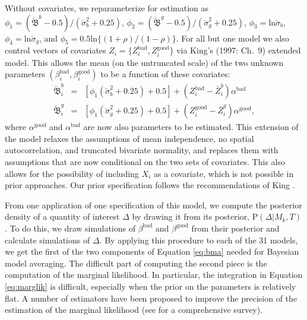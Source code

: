 \documentclass[11pt,titlepage]{article}
\newcommand{\bbetau}{\breve{\mathfrak B}}
\newcommand{\sigmau}{\breve{\sigma}}
\renewcommand{\P}{\text{P}}
\newcommand{\bb}{\beta^{\text{bad}}}
\newcommand{\bg}{\beta^{\text{good}}}
\begin{document}
Without covariates, we reparameterize for estimation as
$\phi_1=(\bbetau^b-0.5)/(\sigmau_b^2+0.25)$,
$\phi_2=(\bbetau^g-0.5)/(\sigmau_g^2+0.25)$,
$\phi_3=\text{ln}\sigmau_b$, $\phi_4=\text{ln}\sigmau_g$, and
$\phi_5=0.5\text{ln}\{(1+\rho)/(1-\rho)\}$.  For all but one model we
also control vectors of covariates
$Z_i=\{Z_i^{\text{bad}},Z_i^{\text{good}}\}$ via King's (1997: Ch.\ 9)
extended model.  This allows the mean (on the untruncated scale) of
the two unknown parameters $(\bb_i, \bg_i)$ to be a function of these
covariates:
\begin{eqnarray}
\bbetau_i^b & = & [\phi_1 (\sigmau^2_b + 0.25) + 0.5] + (Z_i^{\text{bad}} -
\bar{Z}_i^b) \alpha^{\text{bad}} \\
\bbetau_i^g & = & [\phi_1 (\sigmau^2_g + 0.25) + 0.5] + (Z_i^{\text{good}} -
\bar{Z}_i^g) \alpha^{\text{good}},
\end{eqnarray}
where $\alpha^{\text{good}}$ and $\alpha^{\text{bad}}$ are now also
parameters to be estimated.  This extension of the model relaxes the
assumptions of mean independence, no spatial autocorrelation, and
truncated bivariate normality, and replaces them with assumptions that
are now conditional on the two sets of covariates.  This also allows
for the possibility of including $X_i$ as a covariate, which is not
possible in prior approaches.  Our prior specification follows the
recommendations of King \citeyear[chapter7]{king:97}.

From one application of one specification of this model, we compute
the posterior density of a quantity of interest $\Delta$ by drawing it
from its posterior, $\P(\Delta|M_k,T)$.  To do this, we draw
simulations of $\bb$ and $\bg$ from their posterior and calculate
simulations of $\Delta$.  By applying this procedure to each of the 31
models, we get the first of the two components of Equation
\ref{eq:bma} needed for Bayesian model averaging.  The difficult part
of computing the second piece is the computation of the marginal
likelihood.  In particular, the integration in Equation
\ref{eq:marglik} is difficult, especially when the prior on the
parameters is relatively flat. A number of estimators have been
proposed to improve the precision of the estimation of the marginal
likelihood (see \citet{kass:raft:95} for a comprehensive survey).
\end{document}
